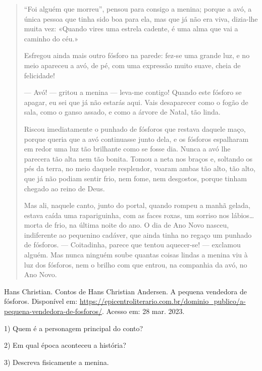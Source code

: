 \begin{itemize}
\begin{itemize}
\begin{quote}
``Foi alguém que morreu'', pensou para consigo a menina; porque a avó, a
única pessoa que tinha sido boa para ela, mas que já não era viva,
dizia-lhe muita vez: «Quando vires uma estrela cadente, é uma alma que
vai a caminho do céu.»

Esfregou ainda mais outro fósforo na parede: fez-se uma grande luz, e no
meio apareceu a avó, de pé, com uma expressão muito suave, cheia de
felicidade!

--- Avó! --- gritou a menina --- leva-me contigo! Quando este fósforo se
apagar, eu sei que já não estarás aqui. Vais desaparecer como o fogão de
sala, como o ganso assado, e como a árvore de Natal, tão linda.

Riscou imediatamente o punhado de fósforos que restava daquele maço,
porque queria que a avó continuasse junto dela, e os fósforos espalharam
em redor uma luz tão brilhante como se fosse dia. Nunca a avó lhe
parecera tão alta nem tão bonita. Tomou a neta nos braços e, soltando os
pés da terra, no meio daquele resplendor, voaram ambas tão alto, tão
alto, que já não podiam sentir frio, nem fome, nem desgostos, porque
tinham chegado ao reino de Deus.

Mas ali, naquele canto, junto do portal, quando rompeu a manhã gelada,
estava caída uma rapariguinha, com as faces roxas, um sorriso nos
lábios\ldots{} morta de frio, na última noite do ano. O dia de Ano Novo
nasceu, indiferente ao pequenino cadáver, que ainda tinha no regaço um
punhado de fósforos. --- Coitadinha, parece que tentou aquecer-se! ---
exclamou alguém. Mas nunca ninguém soube quantas coisas lindas a menina
viu à luz dos fósforos, nem o brilho com que entrou, na companhia da
avó, no Ano Novo.
\end{quote}

Hans Christian. Contos de Hans Christian Andersen. A pequena vendedora
de fósforos. Disponível em:
\url{https://epicentroliterario.com.br/dominio_publico/a-pequena-vendedora-de-fosforos/}.
Acesso em: 28 mar. 2023.

1) Quem é a personagem principal do conto?



2) Em qual época aconteceu a história?



3) Descreva fisicamente a menina.



\end{itemize}
\end{itemize}
